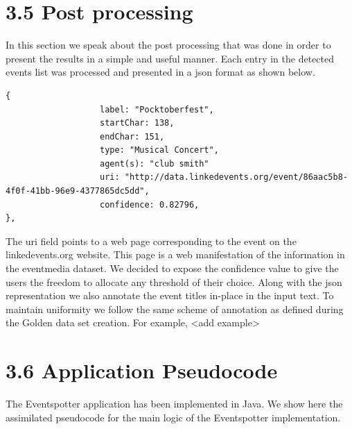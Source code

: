 \documentclass[a4paper,11pt]{report}
\begin{document}

\section*{3.5 Post processing}

In this section we speak about the post processing that was done in order to present the results in a simple and useful manner. Each entry in the detected events list was processed and presented in a json format as shown below.
\begin{lstlisting}
{
                   label: "Pocktoberfest",
                   startChar: 138,
                   endChar: 151,
                   type: "Musical Concert",
                   agent(s): "club smith"
                   uri: "http://data.linkedevents.org/event/86aac5b8-4f0f-41bb-96e9-4377865dc5dd",
                   confidence: 0.82796,
},
\end{lstlisting}
The uri field points to a web page corresponding to the event on the linkedevents.org website. This page is a  web manifestation of the information in the eventmedia dataset. We decided to expose the confidence value to give the users the freedom to allocate any threshold of their choice. Along with the json representation we also annotate the event titles in-place in the input text. To maintain uniformity we follow the same scheme of annotation as defined during the Golden data set creation. For example, <add example>

\section*{3.6 Application Pseudocode}
The Eventspotter application has been implemented in Java. We show here the assimilated pseudocode for the main logic of the Eventspotter implementation.
\end{document}
